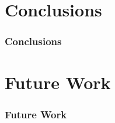\documentclass[aspectratio=169]{beamer}
\begin{document}

\section{Conclusions}

\begin{frame}
  \frametitle{Conclusions}
\end{frame}

\section{Future Work}

\begin{frame}
  \frametitle{Future Work}
\end{frame}
\end{document}
